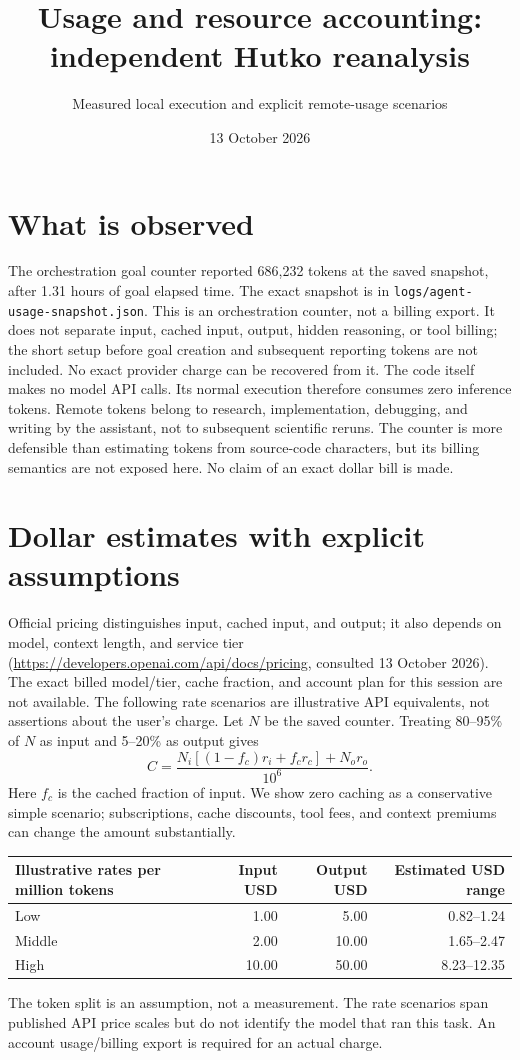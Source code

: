 \documentclass[11pt]{article}
\begin{document}
\title{Usage and resource accounting: independent Hutko reanalysis}
\author{Measured local execution and explicit remote-usage scenarios}
\date{13 October 2026}\maketitle
\section{What is observed}
The orchestration goal counter reported 686,232 tokens at the saved snapshot, after 1.31 hours of goal elapsed time. The exact snapshot is in \texttt{logs/agent-usage-snapshot.json}. This is an orchestration counter, not a billing export. It does not separate input, cached input, output, hidden reasoning, or tool billing; the short setup before goal creation and subsequent reporting tokens are not included. No exact provider charge can be recovered from it.
The code itself makes no model API calls. Its normal execution therefore consumes
zero inference tokens. Remote tokens belong to research, implementation, debugging,
and writing by the assistant, not to subsequent scientific reruns. The counter
is more defensible than estimating tokens from source-code characters, but its
billing semantics are not exposed here. No claim of an exact dollar bill is made.
\section{Dollar estimates with explicit assumptions}
Official pricing distinguishes input, cached input, and output; it also depends
on model, context length, and service tier
(\url{https://developers.openai.com/api/docs/pricing}, consulted 13 October 2026).
The exact billed model/tier, cache fraction, and account plan for this session are
not available. The following rate scenarios are illustrative API equivalents,
not assertions about the user's charge. Let $N$ be the saved counter. Treating
80--95\% of $N$ as input and 5--20\% as output gives
\[
C = \frac{N_i[(1-f_c)r_i+f_c r_c]+N_o r_o}{10^6}.
\]
Here $f_c$ is the cached fraction of input. We show zero caching as a conservative
simple scenario; subscriptions, cache discounts, tool fees, and context premiums
can change the amount substantially.
\begin{center}\begin{tabular}{lrrr}\toprule
Illustrative rates per million tokens & Input USD & Output USD & Estimated USD range\\\midrule
Low & 1.00 & 5.00 & 0.82--1.24 \\
Middle & 2.00 & 10.00 & 1.65--2.47 \\
High & 10.00 & 50.00 & 8.23--12.35 \\
\bottomrule\end{tabular}\end{center}
The token split is an assumption, not a measurement. The rate scenarios span
published API price scales but do not identify the model that ran this task.
An account usage/billing export is required for an actual charge.
\end{document}
